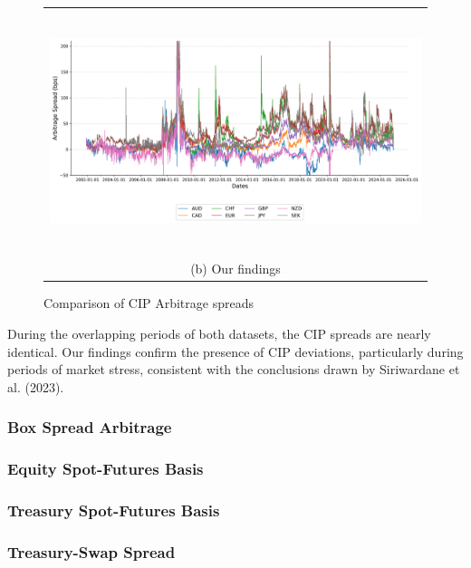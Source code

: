 \documentclass{article}
\begin{document}
\begin{appendices}
\begin{figure}
  \vspace{\floatsep}

  \begin{tabular}{@{}c@{}}
    \includegraphics[width=.7\linewidth,height=200pt,width=400pt]{../docs_src/CIP_replicate.png} \\[\abovecaptionskip]
    \small (b) Our findings
  \end{tabular}

  \caption{Comparison of CIP Arbitrage spreads}
  \label{fig:CIP_replicate}
\end{figure}

\FloatBarrier


During the overlapping periods of both datasets, the CIP spreads are nearly identical.
Our findings confirm the presence of CIP deviations, particularly during periods of
market stress, consistent with the conclusions drawn by Siriwardane et al. (2023).


\subsubsection{Box Spread Arbitrage}

\subsubsection{Equity Spot-Futures Basis}

\subsubsection{Treasury Spot-Futures Basis}

\subsubsection{Treasury-Swap Spread}


\end{appendices}
\end{document}
